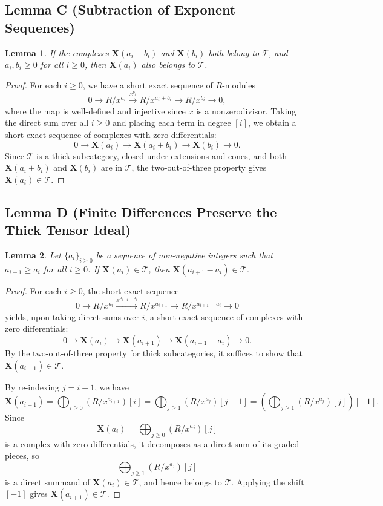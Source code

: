 \documentclass[11pt]{article}
\newtheorem{lemma}{Lemma}
\newcommand{\XX}{\mathbf{X}}
\newcommand{\TT}{\mathcal{T}}
\begin{document}
\subsection*{Lemma C (Subtraction of Exponent Sequences)}

\begin{lemma}
If the complexes $\XX(a_i+b_i)$ and $\XX(b_i)$ both belong to $\TT$, and $a_i,b_i \geqslant 0$ for all $i \geqslant 0$, then $\XX(a_i)$ also belongs to $\TT$.
\end{lemma}

\begin{proof}
For each $i \geqslant 0$, we have a short exact sequence of $R$-modules
\[
0 \to R/x^{a_i} \xrightarrow{x^{b_i}} R/x^{a_i+b_i} \to R/x^{b_i} \to 0,
\]
where the map is well-defined and injective since $x$ is a nonzerodivisor. Taking the direct sum over all $i \geqslant 0$ and placing each term in degree $[i]$, we obtain a short exact sequence of complexes with zero differentials:
\[
0 \to \XX(a_i) \to \XX(a_i+b_i) \to \XX(b_i) \to 0.
\]
Since $\TT$ is a thick subcategory, closed under extensions and cones, and both $\XX(a_i+b_i)$ and $\XX(b_i)$ are in $\TT$, the two-out-of-three property gives $\XX(a_i)\in\TT$.
\end{proof}

\subsection*{Lemma D (Finite Differences Preserve the Thick Tensor Ideal)}

\begin{lemma}
Let $\{a_i\}_{i \geqslant 0}$ be a sequence of non-negative integers such that $a_{i+1} \geqslant a_i$ for all $i \geqslant 0$. If $\XX(a_i)\in\TT$, then $\XX(a_{i+1}-a_i)\in\TT$.
\end{lemma}

\begin{proof}
For each $i \geqslant 0$, the short exact sequence
\[
0 \to R/x^{a_i} \xrightarrow{x^{a_{i+1}-a_i}} R/x^{a_{i+1}} \to R/x^{a_{i+1}-a_i} \to 0
\]
yields, upon taking direct sums over $i$, a short exact sequence of complexes with zero differentials:
\[
0 \to \XX(a_i) \to \XX(a_{i+1}) \to \XX(a_{i+1}-a_i) \to 0.
\]
By the two-out-of-three property for thick subcategories, it suffices to show that $\XX(a_{i+1})\in\TT$.

By re-indexing $j=i+1$, we have
\[
\XX(a_{i+1})
=
\bigoplus_{i \geqslant 0}(R/x^{a_{i+1}})[i]
=
\bigoplus_{j \geqslant 1}(R/x^{a_j})[j-1]
=
\left(\bigoplus_{j \geqslant 1}(R/x^{a_j})[j]\right)[-1].
\]
Since
\[
\XX(a_i)=\bigoplus_{j \geqslant 0}(R/x^{a_j})[j]
\]
is a complex with zero differentials, it decomposes as a direct sum of its graded pieces, so
\[
\bigoplus_{j \geqslant 1}(R/x^{a_j})[j]
\]
is a direct summand of $\XX(a_i)\in\TT$, and hence belongs to $\TT$. Applying the shift $[-1]$ gives $\XX(a_{i+1})\in\TT$.
\end{proof}
\end{document}
